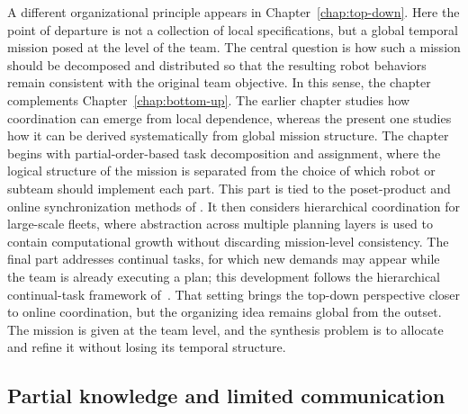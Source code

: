 A different organizational principle appears in
Chapter~\ref{chap:top-down}. Here the point of departure is not a collection of
local specifications, but a global temporal mission posed at the level of the
team. The central question is how such a mission should be decomposed and
distributed so that the resulting robot behaviors remain consistent with the
original team objective. In this sense, the chapter complements
Chapter~\ref{chap:bottom-up}. The earlier chapter studies how coordination can
emerge from local dependence, whereas the present one studies how it can be
derived systematically from global mission structure.
The chapter begins with partial-order-based task decomposition and assignment,
where the logical structure of the mission is separated from the choice of
which robot or subteam should implement each part. This part is tied to the
poset-product and online synchronization methods of
\citet{liu2022arxiv,liu2024time}. It then considers hierarchical coordination
for large-scale fleets, where abstraction across multiple planning layers is
used to contain computational growth without discarding mission-level
consistency. The final part addresses continual tasks, for which new demands
may appear while the team is already executing a plan; this development follows
the hierarchical continual-task framework of~\citet{luo2025hulk,wang2026hector}.
That setting brings the top-down perspective closer to online coordination, but the
organizing idea remains global from the outset. The mission is given at the
team level, and the synthesis problem is to allocate and refine it without
losing its temporal structure.

\subsection{Partial knowledge and limited communication}
\label{sec:ch01:outline:partial}

